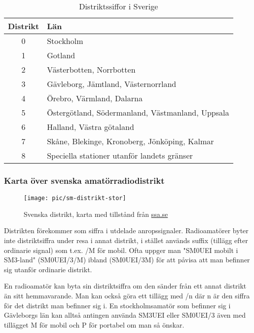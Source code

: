 \begin{table}[h]
	\centering
\begin{tabular}{cl}
	\textbf{Distrikt} & \textbf{Län}                                     \\ \hline %
	      0        & Stockholm                                        \\
	      1        & Gotland                                          \\
	      2        & Västerbotten, Norrbotten                         \\
	      3        & Gävleborg, Jämtland, Västernorrland              \\
	      4        & Örebro, Värmland, Dalarna                        \\
	      5        & Östergötland, Södermanland, Västmanland, Uppsala \\
	      6        & Halland, Västra götaland                         \\
	      7        & Skåne, Blekinge, Kronoberg, Jönköping, Kalmar    \\
	      8        & Speciella stationer utanför landets gränser
\end{tabular}
\caption{Distriktssiffor i Sverige}
\end{table}

\subsubsection{Karta över svenska amatörradiodistrikt}

\begin{figure}
	\centering
	\texttt{[image: pic/sm-distrikt-stor]}
	\label{fig:sm-distrikt}
	\caption{Svenska distrikt, karta med tillstånd från
          \href{https://SSA.SE}{ssa.se}}
\end{figure}

Distrikten förekommer som siffra i utdelade
anropssignaler. Radioamatörer byter inte distriktsiffra under resa i
annat distrikt, i stället används suffix (tillägg efter ordinarie
signal) som t.ex. /M för mobil. Ofta uppger man "SM0UEI mobilt i
SM3-land" (SM0UEI/3/M) ibland (SM0UEI/3M) för att påvisa att man
befinner sig utanför ordinarie distrikt.

En radioamatör kan byta sin distriktsiffra om den sänder från ett
annat distrikt än sitt hemmavarande. Man kan också göra ett tillägg
med /n där n är den siffra för det distrikt man befinner sig i. En
stockholmsamatör som befinner sig i Gävleborgs län kan alltså antingen
använda SM3UEI eller SM0UEI/3 även med tillägget M för mobil och P för
portabel om man så önskar.

